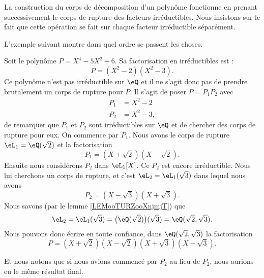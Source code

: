 \begin{normaltext}
    La construction du corps de décomposition d'un polynôme fonctionne en prenant successivement le corps de rupture des facteurs irréductibles. Nous insistons sur le fait que cette opération se fait sur chaque facteur irréductible séparément.

    L'exemple suivant montre dans quel ordre se passent les choses.
    \begin{example}
        Soit le polynôme \( P=X^4-5X^2+6\). Sa factorisation en irréductibles est :
        \begin{equation}
            P=(X^2-2)(X^2-3).
        \end{equation}
        Ce polynôme n'est pas irréductible sur \( \eQ\) et il ne s'agit donc pas de prendre brutalement un corps de rupture pour \( P\). Il s'agit de poser \( P=P_1P_2\) avec
        \begin{subequations}
            \begin{align}
                P_1&=X^2-2\\
                P_2&=X^2-3,
            \end{align}
        \end{subequations}
        de remarquer que \( P_1\) et \( P_2\) sont irréductibles sur \( \eQ\) et de chercher des corps de rupture pour eux. On commence par \( P_1\). Nous avons le corps de rupture \( \eL_1=\eQ(\sqrt{ 2 })\) et la factorisation
        \begin{equation}
            P_1=(X+\sqrt{ 2 })(X-\sqrt{ 2 }).
        \end{equation}
        Ensuite nous considérons \( P_2\) dans \( \eL_1[X]\). Ce \( P_2\) est encore irréductible. Nous lui cherchons un corps de rupture, et c'est \( \eL_2=\eL_1(\sqrt{ 3 })\) dans lequel nous avons
        \begin{equation}
            P_2=(X-\sqrt{ 3 })(X+\sqrt{ 3 }).
        \end{equation}
        Nous savons (par le lemme \ref{LEMooTURZooXnjmjT}) que 
        \begin{equation}
            \eL_2=\eL_1(\sqrt{ 3 })=\big( \eQ(\sqrt{ 2 }) \big)(\sqrt{ 3 })=\eQ(\sqrt{ 2 },\sqrt{ 3 }).
        \end{equation}
        Nous pouvons donc écrire en toute confiance, dans \( \eQ(\sqrt{ 2 },\sqrt{ 3 })\) la factorisation
        \begin{equation}
            P=(X+\sqrt{ 2 })(X-\sqrt{ 2 })(X+\sqrt{ 3 })(X-\sqrt{ 3 }).
        \end{equation}

        Et nous notons que si nous avions commencé par \( P_2\) au lieu de \( P_2\), nous aurions eu le même résultat final.
    \end{example}
\end{normaltext}

